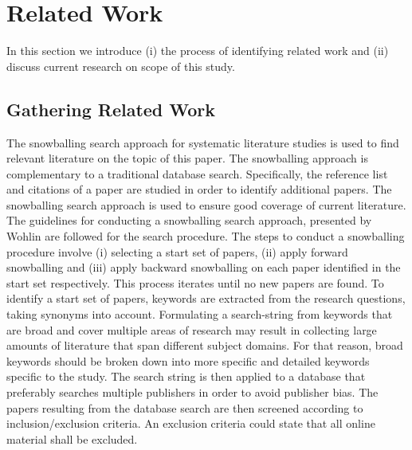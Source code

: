 \iffalse  \fi

\chapter{Related Work} \label{section:relatedwork} 
In this section we introduce (i) the process of identifying related work and (ii) discuss current research on scope of this study. %




\section{Gathering Related Work}
The snowballing search approach for systematic literature studies is used to find relevant literature on the topic of this paper. The snowballing approach is complementary to a traditional database search. Specifically, the reference list and citations of a paper are studied in order to identify additional papers. The snowballing search approach is used to ensure good coverage of current literature.\\

The guidelines for conducting a snowballing search approach, presented by Wohlin \cite{Wohlin} are followed for the search procedure. The steps to conduct a snowballing procedure involve (i) selecting a start set of papers, (ii) apply forward snowballing and (iii) apply backward snowballing on each paper identified in the start set respectively. This process iterates until no new papers are found. To identify a start set of papers, keywords are extracted from the research questions, taking synonyms into account. Formulating a search-string from keywords that are broad and cover multiple areas of research may result in collecting large amounts of literature that span different subject domains. For that reason, broad keywords should be broken down into more specific and detailed keywords specific to the study. The search string is then applied to a database that preferably searches multiple publishers in order to avoid publisher bias. The papers resulting from the database search are then screened according to inclusion/exclusion criteria. An exclusion criteria could state that all online material shall be excluded. \\

